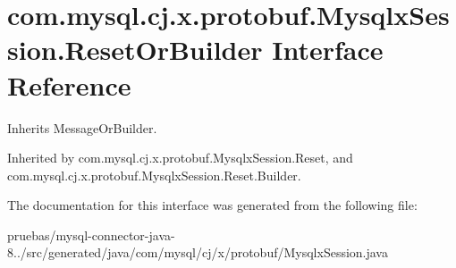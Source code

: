 \hypertarget{interfacecom_1_1mysql_1_1cj_1_1x_1_1protobuf_1_1_mysqlx_session_1_1_reset_or_builder}{}\section{com.\+mysql.\+cj.\+x.\+protobuf.\+Mysqlx\+Session.\+Reset\+Or\+Builder Interface Reference}
\label{interfacecom_1_1mysql_1_1cj_1_1x_1_1protobuf_1_1_mysqlx_session_1_1_reset_or_builder}


Inherits Message\+Or\+Builder.



Inherited by com.\+mysql.\+cj.\+x.\+protobuf.\+Mysqlx\+Session.\+Reset, and com.\+mysql.\+cj.\+x.\+protobuf.\+Mysqlx\+Session.\+Reset.\+Builder.



The documentation for this interface was generated from the following file\+:\begin{DoxyCompactItemize}
\item 
pruebas/mysql-\/connector-\/java-\/8../src/generated/java/com/mysql/cj/x/protobuf/Mysqlx\+Session.\+java\end{DoxyCompactItemize}
